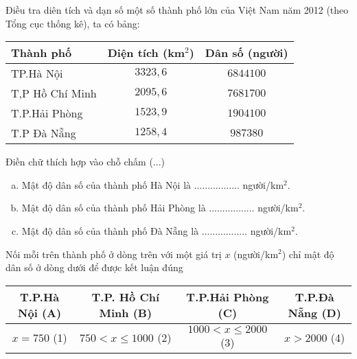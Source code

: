 	\begin{ex} %
	Điều tra diên tích và dạn số một số thành phố lớn của Việt Nam năm 2012 (theo Tổng cục thống kê), ta có bảng: 	
		\begin{center}
			\begin{tabular}{|l|c|c|}
				\hline
				Thành phố & Diện tích (km$ ^2 $) & Dân số (người)\\ \hline
				TP.Hà Nội & $ 3323{,}6 $  & $ 6844100 $\\ \hline
				T,P Hồ Chí Minh & $ 2095{,}6 $  & $ 7681700 $ \\ \hline
				T.P.Hải Phòng &  $ 1523{,}9 $  & $ 1904100 $ \\ \hline
				T.P Đà Nẵng& $ 1258{,}4 $  & $ 987380 $ \\ \hline
			\end{tabular}
		\end{center}
	Điền chữ thích hợp vào chỗ chấm (...)
		\begin{enumerate}[a)]
			\item Mật độ dân số của thành phố Hà Nội là ................. người/km$ ^2 $. 
			\item Mật độ dân số của thành phố Hải Phòng là ................. người/km$ ^2 $. 
			\item Mật độ dân số của thành phố Đà Nẵng là ................. người/km$ ^2 $. 
		\end{enumerate}
	\end{ex}


	\begin{ex}%
		Nối mỗi trên thành phố ở dòng trên với một giá trị $ x $ (người/km$ ^2 $) chỉ mật độ dân số ở dòng dưới để được kết luận đúng
			\begin{center}
				\begin{tabular}{|c|c|c|c|}
					\hline
					T.P.Hà Nội (A) & T.P. Hồ Chí Minh (B) & T.P.Hải Phòng (C) & T.P.Đà Nẵng (D) \\ \hline
					$ x=750 $ (1) & $ 750 < x \le 1000  $ (2)& $ 1000 < x \le 2000 $ (3) & $ x>2000 $ (4)\\ \hline
				\end{tabular}
			\end{center}
	\end{ex}


